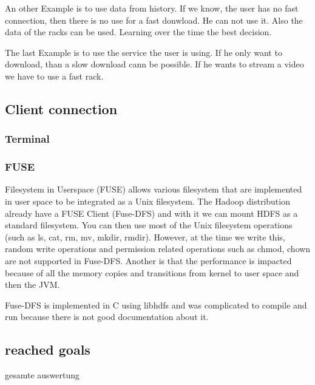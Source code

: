An other Example is to use data from history. If we know, the user has no fast connection, then there is no use for a fast donwload. He can not use it. Also the data of the racks can be used. Learning over the time the best decision.

The last Example is to use the service the user is using. If he only want to download, than a slow download cann be possible. If he wants to stream a video we have to use a fast rack.

\subsection{Client connection}
\label{sec:hdfs_client}
\subsubsection{Terminal}
\subsubsection{FUSE}

Filesystem in Userspace (FUSE) allows various filesystem that are implemented in user space to be integrated as a Unix filesystem. The Hadoop distribution already have a FUSE Client (Fuse-DFS) and with it we can mount HDFS as a standard filesystem. You can then use most of the Unix filesystem operations (such as ls, cat, rm, mv, mkdir, rmdir). However, at the time we write this, random write operations and permission related operations such as chmod, chown are not supported in Fuse-DFS. Another is that the performance is impacted because of all the memory copies and transitions from kernel to user space and then the JVM.

Fuse-DFS is implemented in C using libhdfs and was complicated to compile and run because there is not good documentation about it.
\subsection{reached goals}
gesamte auswertung





